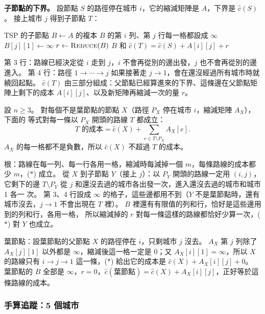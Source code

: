\textbf{子節點的下界。} 設節點 $S$ 的路徑停在城市 $i$，它的縮減矩陣是 $A$，下界是 $\hat c(S)$。
接上城市 $j$ 得到子節點 $T$：

\begin{pseudo}[label=alg:bk-tsp-child]{TSP 的子節點}
    \State $B \gets A$ 的複本
    \State $B$ 的第 $i$ 列、第 $j$ 行每一格都設成 $\infty$ 
    \State $B[j][1] \gets \infty$ 
    \State $r \gets \Call{Reduce}{B}$
    \State \Return $B$ 和 $\hat c(T) = \hat c(S) + A[i][j] + r$
\EndFunction
\end{pseudo}

第 3 行：路線已經決定從 $i$ 走到 $j$，$i$ 不會再從別的邊出發，$j$ 也不會再從別的邊進入。
第 4 行：路徑 $1 \to \cdots \to j$ 如果接著走 $j \to 1$，會在還沒經過所有城市時就繞回起點。
$\hat c(T)$ 由三部分組成：父節點已經算進來的下界、這條邊在父節點矩陣上剩下的成本
$A[i][j]$、以及新矩陣再縮減一次的量 $r$。

\begin{whybox}
設 $n \ge 3$。 對每個不是葉節點的節點 $X$（路徑 $P_X$ 停在城市 $i$，縮減矩陣 $A_X$），下面的
等式對每一條以 $P_X$ 開頭的路線 $T$ 都成立：
\[
\text{$T$ 的成本} = \hat c(X) + \sum_{e \in T \setminus P_X} A_X[e]. \tag{$*$}
\]
$A_X$ 的每一格都不是負數，所以 $\hat c(X)$ 不超過 $T$ 的成本。

根：路線在每一列、每一行各用一格，縮減時每減掉一個 $m$，每條路線的成本都少 $m$，($*$)
成立。 從 $X$ 到子節點 $Y$（接上 $j$）：以 $P_Y$ 開頭的路線一定用 $(i, j)$，它剩下的邊
$T \setminus P_Y$ 從 $j$ 和還沒去過的城市各出發一次，進入還沒去過的城市和城市 1 各一
次。 第 3、4 行設成 $\infty$ 的格子，這些邊都用不到（$Y$ 不是葉節點時，還有城市沒去，$j \to
1$ 不會出現在 $T$ 裡）。 $B$ 裡還有有限值的列和行，恰好是這些邊用到的列和行，各用一格，
所以縮減掉的 $r$ 對每一條這樣的路線都恰好少算一次，($*$) 對 $Y$ 也成立。

葉節點：設葉節點的父節點 $X$ 的路徑停在 $i$，只剩城市 $j$ 沒去。 $A_X$ 第 $j$ 列除了 $A_X[j][1]$
以外都是 $\infty$，縮減後這一格一定是 $0$；又 $A_X[i][1] = \infty$，所以 $X$ 的路線只有
$i \to j \to 1$ 這一條，($*$) 給出它的成本是 $\hat c(X) + A_X[i][j] + 0$。 葉節點的 $B$ 全部是
$\infty$，$r = 0$，$\hat c(\text{葉節點}) = \hat c(X) + A_X[i][j]$，正好等於這條路線的成本。
\end{whybox}

\subsubsection{手算追蹤：5 個城市}

